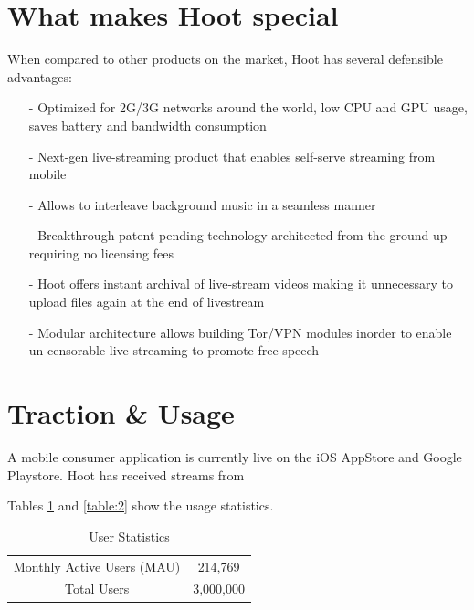 \documentclass{article}
\begin{document}
\section{What makes Hoot special}
When compared to other products on the market, Hoot has several defensible advantages:
\begin{itemize}
\item[-]Optimized for 2G/3G networks around the world, low CPU and GPU usage, saves battery and bandwidth consumption
\item[-]Next-gen live-streaming product that enables self-serve streaming from mobile
\item[-]Allows to interleave background music in a seamless manner
\item[-]Breakthrough patent-pending technology architected from the ground up requiring no licensing fees
\item[-]Hoot offers instant archival of live-stream videos making it unnecessary to upload files again at the end of livestream
\item[-]Modular architecture allows building Tor/VPN modules inorder to enable un-censorable live-streaming to promote free speech
\end{itemize}


\section{Traction \& Usage}
A mobile consumer application is currently live on the iOS AppStore and Google Playstore. Hoot has received streams from 


Tables \ref{table:1} and \ref{table:2} show the usage statistics.

\setlength{\arrayrulewidth}{.7mm}
\setlength{\tabcolsep}{18pt}
\renewcommand{\arraystretch}{2.0} 
 


\begin{table}[!htb]
\centering
\begin{tabular}{ |c|c| }
\hline
\rowcolor{lightgray} \multicolumn{2}{|c|}{User Statistics} \\
\hline
Monthly Active Users (MAU) & 214,769 \\
Total Users & 3,000,000 \\
\hline
\end{tabular}
\caption{User Statistics}
\label{table:1}
\end{table}
\end{document}
